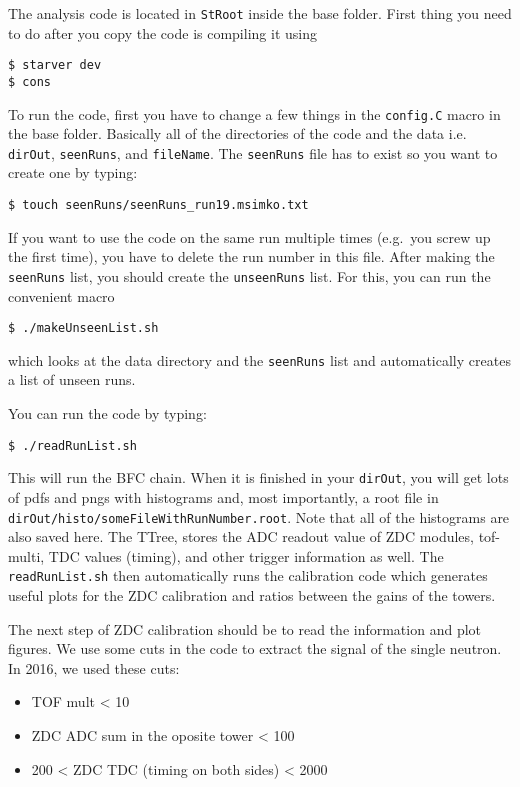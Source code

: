 The analysis code is located in \texttt{StRoot} inside the base folder. First thing you need to do after you
copy the code is compiling it using
\begin{verbatim}
$ starver dev
$ cons
\end{verbatim}
To run the code, first you have to change a few things in the \texttt{config.C} macro in the base folder. 
Basically all of the
directories of the code and the data i.e. \texttt{dirOut}, \texttt{seenRuns}, and \texttt{fileName}. 
The \texttt{seenRuns} file has to
exist so you want to create one by typing:
\begin{verbatim}
$ touch seenRuns/seenRuns_run19.msimko.txt
\end{verbatim}
If you want to use the code
on the same run multiple times (e.g.\ you screw up the first time), you have to delete the run number in
this file. After making the \texttt{seenRuns} list, you should create the \texttt{unseenRuns} list. For this, you  can run the convenient macro
\begin{verbatim}
$ ./makeUnseenList.sh
\end{verbatim}
which looks at the data directory and the \texttt{seenRuns} list and automatically creates a list of unseen runs.

You can run the code by typing:
\begin{verbatim}
$ ./readRunList.sh
\end{verbatim}
This will run the BFC chain. When it is finished
in your \texttt{dirOut}, you will get lots of pdfs and pngs with histograms and, most importantly, a root file in
\texttt{dirOut/histo/someFileWithRunNumber.root}. Note that all of the histograms are also saved here.
The TTree, stores the ADC readout value of ZDC modules, tof-multi,
TDC values (timing), and other trigger information as well.
The \texttt{readRunList.sh} then automatically runs the calibration code which generates useful plots for the ZDC calibration and ratios between the gains of the towers. 

The next step of ZDC calibration
should be to read the information and plot figures.
We use some cuts in the code to extract the signal of the single neutron. In 2016, we used these cuts:

\begin{itemize}
\item TOF mult \textless{} 10
\item ZDC ADC sum in the oposite tower \textless{} 100
\item 200 \textless{} ZDC TDC (timing on both sides) \textless{} 2000
\end{itemize}


